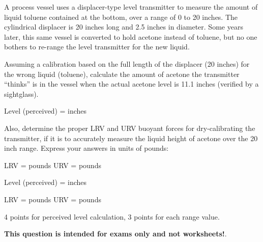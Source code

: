 

A process vessel uses a displacer-type level transmitter to measure the amount of liquid toluene contained at the bottom, over a range of 0 to 20 inches.  The cylindrical displacer is 20 inches long and 2.5 inches in diameter.  Some years later, this same vessel is converted to hold acetone instead of toluene, but no one bothers to re-range the level transmitter for the new liquid.

Assuming a calibration based on the full length of the displacer (20 inches) for the wrong liquid (toluene), calculate the amount of acetone the transmitter ``thinks'' is in the vessel when the actual acetone level is 11.1 inches (verified by a sightglass).

\vskip 10pt

Level (perceived) = \underbar{\hskip 50pt} inches

\vskip 10pt

Also, determine the proper LRV and URV buoyant forces for dry-calibrating the transmitter, if it is to accurately measure the liquid height of acetone over the 20 inch range.  Express your answers in units of pounds:

\vskip 10pt

LRV = \underbar{\hskip 50pt} pounds \hskip 30pt URV = \underbar{\hskip 50pt} pounds







Level (perceived) =  inches

\vskip 10pt

LRV =  pounds \hskip 30pt URV =  pounds

\vskip 10pt

4 points for perceived level calculation, 3 points for each range value.







{\bf This question is intended for exams only and not worksheets!}.




